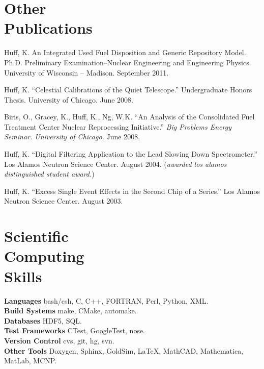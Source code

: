 \documentclass[margin,line]{resume}
\begin{document}
\begin{resume}
    \section{\mysidestyle Other\\Publications}
    \begin{bibenum}
      \item Huff, K. An Integrated Used Fuel Disposition and Generic Repository Model. 
        Ph.D. Preliminary Examination--Nuclear Engineering and Engineering 
        Physics. University of Wisconsin -- Madison.  September 2011. 
      \item Huff, K. ``Celestial Calibrations of the Quiet Telescope.''
        Undergraduate Honors Thesis. University of Chicago. June 2008.
      \item Biris, O., Gracey, K., Huff, K., Ng, W.K.  
        ``An Analysis of the Consolidated Fuel Treatment Center Nuclear 
        Reprocessing Initiative.''
        \emph{Big Problems Energy Seminar. University of Chicago.} June 2008.
      \item Huff, K. ``Digital Filtering Application to the Lead Slowing Down 
        Spectrometer.'' Los Alamos Neutron Science Center. August 2004.  %
        (\emph{awarded los alamos distinguished student award.}) 
      \item Huff, K. ``Excess Single Event Effects in the Second Chip of a Series.'' 
        Los Alamos Neutron Science Center. August 2003. 
    \end{bibenum}

    \section{\mysidestyle Scientific\\Computing\\Skills} 
                \textbf{Languages} \hfill bash/csh, C, C++, FORTRAN, Perl, Python, XML.\vspace{.5mm}\\%
                \textbf{Build Systems} \hfill make, CMake, automake.\vspace{.5mm}\\%
                \textbf{Databases} \hfill HDF5, SQL.\vspace{.5mm}\\%
                \textbf{Test Frameworks} \hfill CTest, GoogleTest, nose.\vspace{.5mm}\\%
                \textbf{Version Control} \hfill cvs, git, hg, svn.\vspace{.5mm}\\%
                \textbf{Other Tools} \hfill Doxygen, Sphinx, GoldSim, \LaTeX, MathCAD, Mathematica, MatLab, MCNP.\vspace{.5mm}\\%


\end{resume}
\end{document}

